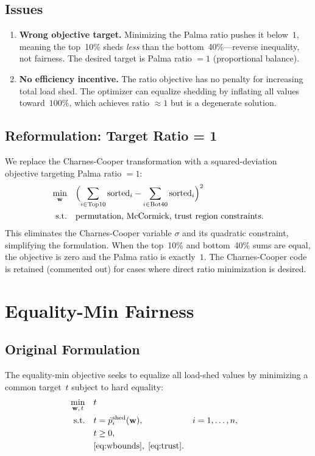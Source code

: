 \documentclass[11pt]{article}
\begin{document}
\subsection{Issues}

\begin{enumerate}
    \item \textbf{Wrong objective target.} Minimizing the Palma ratio pushes it below~$1$, meaning the top~10\% sheds \emph{less} than the bottom~40\%---reverse inequality, not fairness. The desired target is Palma ratio $= 1$ (proportional balance).
    \item \textbf{No efficiency incentive.} The ratio objective has no penalty for increasing total load shed. The optimizer can equalize shedding by inflating all values toward~$100\%$, which achieves ratio $\approx 1$ but is a degenerate solution.
\end{enumerate}

\subsection{Reformulation: Target Ratio = 1}

We replace the Charnes-Cooper transformation with a squared-deviation objective targeting Palma ratio $= 1$:
\begin{align}
    \min_{\mathbf{w}} \quad & \Bigl(\sum_{i \in \mathrm{Top10}} \mathrm{sorted}_i - \sum_{i \in \mathrm{Bot40}} \mathrm{sorted}_i\Bigr)^2 \\
    \text{s.t.} \quad & \text{permutation, McCormick, trust region constraints.} \notag
\end{align}
This eliminates the Charnes-Cooper variable $\sigma$ and its quadratic constraint, simplifying the formulation.
When the top~10\% and bottom~40\% sums are equal, the objective is zero and the Palma ratio is exactly~$1$.
The Charnes-Cooper code is retained (commented out) for cases where direct ratio minimization is desired.

\section{Equality-Min Fairness}\label{sec:equality}

\subsection{Original Formulation}

The equality-min objective seeks to equalize all load-shed values by minimizing a common target~$t$ subject to hard equality:
\begin{align}
    \min_{\mathbf{w},\,t} \quad & t \\
    \text{s.t.} \quad
    & t = \hat{p}_i^{\mathrm{shed}}(\mathbf{w}), & i &= 1,\dots,n, \label{eq:eq-hard}\\
    & t \ge 0, \notag \\
    & \eqref{eq:wbounds},\;\eqref{eq:trust}. \notag
\end{align}
\end{document}

